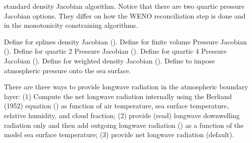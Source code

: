 \begin{klist}
standard density Jacobian algorithm. Notice that there are two
quartic pressure Jacobian options. They differ on how the WENO
reconciliation
step is done and in the monotonicity constraining algorithms.
  \begin{klist}
      Define for splines density Jacobian
  (\cite{SS2003}).
      Define for finite volume Pressure Jacobian
  (\cite{Lin97}).
      Define for quartic 2 Pressure Jacobian
  (\cite{SS2003}).
      Define for quartic 4 Pressure Jacobian
  (\cite{SS2003}).
      Define for weighted density Jacobian
  (\cite{Song98}).
      Define to impose atmospheric pressure onto the sea
  surface.
  \end{klist}
   There are three ways to provide longwave radiation in the atmospheric
 boundary layer: (1) Compute the net longwave radiation internally
 using the Berliand (1952) equation () as function of
 air temperature, sea surface temperature, relative humidity, and cloud
 fraction; (2) provide (read) longwave downwelling radiation only  and
 then add outgoing longwave radiation () as a function
 of the model sea surface temperature; (3) provide net longwave radiation
 (default).


\end{klist}
